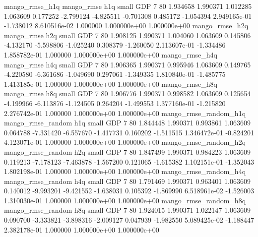        mango_rmse_h1q        mango_rmse                  h1q      small      GDP                 7 80 1.934658       1.990371 1.012285       1.063609    0.177252     -2.799124     -4.825511    -0.701308       0.485172 -1.054394 2.949165e-01    -1.738012   8.610516e-02            1.000000    1.000000e+00        1.000000e+00
       mango_rmse_h2q        mango_rmse                  h2q      small      GDP                 7 80 1.908125       1.990371 1.004060       1.063609    0.145806     -4.132170     -5.598806    -1.025240       0.308379 -1.260050 2.113607e-01    -1.334486   1.858782e-01            1.000000    1.000000e+00        1.000000e+00
       mango_rmse_h4q        mango_rmse                  h4q      small      GDP                 7 80 1.906365       1.990371 0.995946       1.063609    0.149765     -4.220580     -6.361686    -1.049690       0.297061 -1.349335 1.810840e-01    -1.485775   1.413185e-01            1.000000    1.000000e+00        1.000000e+00
       mango_rmse_h8q        mango_rmse                  h8q      small      GDP                 7 80 1.906776       1.990371 0.998582       1.063609    0.125654     -4.199966     -6.113876    -1.124505       0.264204 -1.499553 1.377160e-01    -1.215820   2.276742e-01            1.000000    1.000000e+00        1.000000e+00
mango_rmse_random_h1q mango_rmse_random                  h1q      small      GDP                 7 80 1.844448       1.990371 0.993861       1.063609    0.064788     -7.331420     -6.557670    -1.417731       0.160202 -1.511515 1.346472e-01    -0.824201   4.123071e-01            1.000000    1.000000e+00        1.000000e+00
mango_rmse_random_h2q mango_rmse_random                  h2q      small      GDP                 7 80 1.847499       1.990371 0.984223       1.063609    0.119213     -7.178123     -7.463878    -1.567200       0.121065 -1.615382 1.102151e-01    -1.352043   1.802198e-01            1.000000    1.000000e+00        1.000000e+00
mango_rmse_random_h4q mango_rmse_random                  h4q      small      GDP                 7 80 1.791469       1.990371 0.963401       1.063609    0.140012     -9.993201     -9.421552    -1.638031       0.105392 -1.869990 6.518961e-02    -1.526003   1.310030e-01            1.000000    1.000000e+00        1.000000e+00
mango_rmse_random_h8q mango_rmse_random                  h8q      small      GDP                 7 80 1.924015       1.990371 1.022147       1.063609    0.090700     -3.333821     -3.898316    -2.009127       0.047939 -1.982550 5.089425e-02    -1.188447   2.382178e-01            1.000000    1.000000e+00        1.000000e+00
